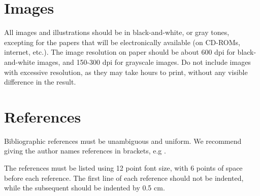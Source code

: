 \documentclass[12pt]{article}
\begin{document}
\section{Images}

All images and illustrations should be in black-and-white, or gray tones,
excepting for the papers that will be electronically available (on CD-ROMs,
internet, etc.). The image resolution on paper should be about 600 dpi for
black-and-white images, and 150-300 dpi for grayscale images.  Do not include
images with excessive resolution, as they may take hours to print, without any
visible difference in the result. 

\section{References}

Bibliographic references must be unambiguous and uniform.  We recommend giving
the author names references in brackets, e.g \cite{boulic:91}.

The references must be listed using 12 point font size, with 6 points of space
before each reference. The first line of each reference should not be
indented, while the subsequent should be indented by 0.5 cm.



\end{document}
